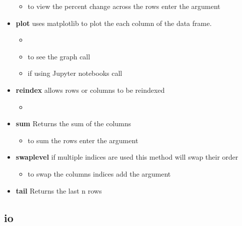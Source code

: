\begin{itemize}
\begin{itemize}
      \item to view the percent change across the rows enter the argument
        \color{red}{axis=1}
    \end{itemize}

  \item \textbf{plot} uses matplotlib to plot the each column of the data frame.
    \begin{itemize}

      \item {\color{red}{make sure to import matplotlib before calling this
        method}}

      \item to see the graph call {\color{red}{plt.show()}}

      \item if using Jupyter notebooks call {\color{red}{\%matplotlib inline}}
    \end{itemize}

  \item \textbf{reindex} allows rows or columns to be reindexed
    \begin{itemize}

      \item \color{red}{if no arguments are passed the rows will be reindexed,
        and if the columns argument is passed the columns will be reindexed.}
    \end{itemize}

  \item \textbf{sum} Returns the sum of the columns
    \begin{itemize}

      \item to sum the rows enter the argument \color{red}{axis=1}
    \end{itemize}

  \item \textbf{swaplevel} if multiple indices are used this method will swap
    their order
    \begin{itemize}

      \item to swap the columns indices add the argument {\color{red}{axis=1}}
    \end{itemize}

  \item \textbf{tail} Returns the last n rows
\end{itemize}

\subsection{io}

